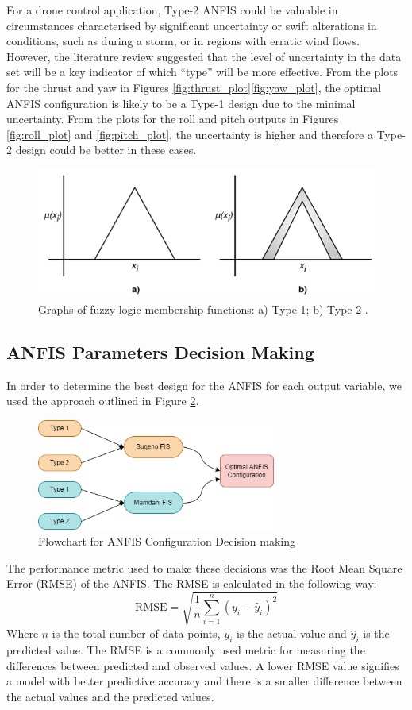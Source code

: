 For a drone control application, Type-2 ANFIS could be valuable in circumstances characterised by significant uncertainty or swift alterations in conditions, such as during a storm, or in regions with erratic wind flows. However, the literature review suggested that the level of uncertainty in the data set will be a key indicator of which ``type'' will be more effective. From the plots for the thrust and yaw in Figures \ref{fig:thrust_plot}\ref{fig:yaw_plot}, the optimal ANFIS configuration is likely to be a Type-1 design due to the minimal uncertainty. From the plots for the roll and pitch outputs in Figures \ref{fig:roll_plot} and \ref{fig:pitch_plot}, the uncertainty is higher and therefore a Type-2 design could be better in these cases. 
\begin{figure}[H]
    \centering
    \includegraphics[width = 0.7 \textwidth]{img/Picture9.png}
    \caption[Graphs of fuzzy logic membership functions: a) Type-1; b) Type-2.]{Graphs of fuzzy logic membership functions: a) Type-1; b) Type-2 \cite{boxi8}.}
    \label{fig:type}
\end{figure}
\subsection{ANFIS Parameters Decision Making}
In order to determine the best design for the ANFIS for each output variable, we used the approach outlined in Figure \ref{fig:flow_fis}.
\begin{figure}[H]
    \centering
    \includegraphics[width = 0.7\textwidth]{img/5.5drawio.png}
    \caption{Flowchart for ANFIS Configuration Decision making}
    \label{fig:flow_fis}
\end{figure}
The performance metric used to make these decisions was the Root Mean Square Error (RMSE) of the ANFIS. The RMSE is calculated in the following way:
\begin{equation}
\text{RMSE} = \sqrt{\frac{1}{n} \sum_{i=1}^{n} (y_i - \hat{y}_i)^2}
\end{equation}
Where $n$ is the total number of data points, $y_i$ is the actual value and $\hat{y}_i$ is the predicted value. The RMSE is a commonly used metric for measuring the differences between predicted and observed values. A lower RMSE value signifies a model with better predictive accuracy and there is a smaller difference between the actual values and the predicted values. 
